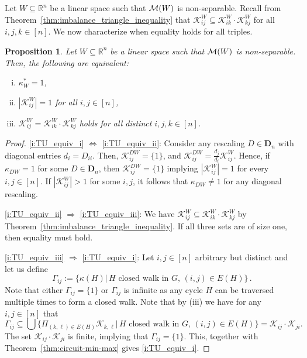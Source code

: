 \documentclass[11pt, a4paper]{article}
\newcommand{\Le}{\kappa}
\newcommand{\1}{\mathbbm{1}}
\newcommand{\KK}{\mathcal K}
\newcommand{\bD}{\mathbf{D}}
\newtheorem{prop}[theorem]{Proposition}
\theoremstyle{case}
\newcommand{\R}{\mathbb{R}}
\begin{document}
Let $W\subseteq \R^n$ be a linear space such that ${\cal M}(W)$ is non-separable.
Recall from Theorem~\ref{thm:imbalance_triangle_inequality} that 
$\KK_{ij}^W\subseteq \KK_{ik}^W \cdot \KK_{kj}^W$ for all $i,j,k\in [n]$. We now characterize when equality holds for all triples.
\begin{prop}
\label{prop:reverse-kappa-1}
Let $W\subseteq \R^n$ be a linear space such that ${\cal M}(W)$ is non-separable. Then, the following are equivalent:
\begin{enumerate}[(i)]
\item\label{i:TU_equiv_i} $\Le^*_W=1$,
\item\label{i:TU_equiv_ii} $|\KK_{ij}^W|=1$ for all $i,j\in [n]$, 
\item\label{i:TU_equiv_iii}  $\KK_{ij}^W= \KK_{ik}^W \cdot \KK_{kj}^W$ holds for all distinct $i,j,k\in [n]$.
\end{enumerate}
\end{prop}
\begin{proof} 
\ref{i:TU_equiv_i} $\Leftrightarrow$ \ref{i:TU_equiv_ii}:
Consider any  rescaling  $D\in\bD_n$ with diagonal entries $d_i=D_{ii}$.
Then,  $\KK_{ij}^{DW}=\{1\}$, and $\KK_{ij}^{DW}=\frac{d_j}{d_i}\KK_{ij}^{W}$. Hence, if $\Le_{DW}=1$ for some $D\in\bD_n$, then  $\KK_{ij}^{DW}=\{1\}$ implying $|\KK_{ij}^W|=1$  for every $i,j\in [n]$. If $|\KK_{ij}^{W}|>1$ for some $i,j$, it follows that $\Le_{DW}\neq 1$ for any diagonal rescaling. 

\noindent \ref{i:TU_equiv_ii} $\Rightarrow$ \ref{i:TU_equiv_iii}: 
 We have $\KK_{ij}^W\subseteq \KK_{ik}^W \cdot \KK_{kj}^W$ by Theorem~\ref{thm:imbalance_triangle_inequality}. If all three sets are of size one, then equality must hold.

\noindent \ref{i:TU_equiv_iii} $\Rightarrow$ \ref{i:TU_equiv_i}: 
Let $i,j \in [n]$ arbitrary but distinct and let us define
 $$\Gamma_{ij} := \{\kappa(H) |\, \text{$H$ closed walk in $G$, $(i,j) \in E(H)$}\}\, .$$
 Note that either $\Gamma_{ij} = \{1\}$ or $\Gamma_{ij}$ is infinite as any cycle $H$ can be traversed multiple times to form a closed walk. Note that by (iii) we have for any $i,j \in [n]$ that
\begin{equation}
  \Gamma_{ij} \subseteq \bigcup  \Big\{\Pi_{(k,\ell) \in E(H)} \mathcal K_{k,\ell} |\, \text{$H$ closed walk in $G$, $(i,j) \in E(H)$}\Big\}
  = \mathcal K_{ij} \cdot\mathcal K_{ji}. 
\end{equation}
The set $\mathcal K_{ij} \cdot\mathcal K_{ji}$ is finite, implying that $\Gamma_{ij} = \{1\}$. This, together with Theorem~\ref{thm:circuit-min-max} gives \ref{i:TU_equiv_i}.
\end{proof}
\end{document}
